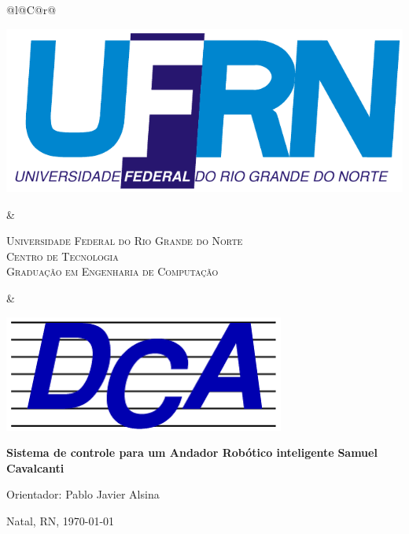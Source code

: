 %
%

\begin{titlepage}

\begin{center}

\small

\begin{tabularx}{\linewidth}{@{}l@{}C@{}r@{}}
\parbox[c]{3cm}{\includegraphics[width=\linewidth]{./figuras/UFRN}} &
\begin{center}
\textsf{\textsc{Universidade Federal do Rio Grande do Norte\\
Centro de Tecnologia\\
Graduação em Engenharia de Computação}}
\end{center} &
\parbox[c]{3cm}{\includegraphics[width=\linewidth]{./figuras/dca_logo.png}}
\end{tabularx}

\vfill
\LARGE
\textbf{Sistema de controle para um Andador Robótico inteligente}
\vfill
\Large
\textbf{Samuel Cavalcanti}
\vfill

\normalsize

Orientador: Pablo Javier Alsina

\vfill

\hfill


\vfill

\large

Natal, RN, \today

\end{center}

\end{titlepage}